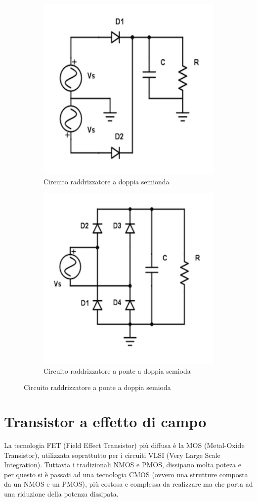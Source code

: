 \documentclass[a4paper,portrait,12pt]{article}
\theoremstyle{definition}
\begin{document}
\begin{figure}[H]
\begin{subfigure}{.5\textwidth}
\centering
\includegraphics[width=.5\linewidth]{img/radd.pdf}
\caption{Circuito raddrizzatore a doppia semionda}
\label{fig:integratore}
\end{subfigure}
\begin{subfigure}{.5\textwidth}
\centering
\includegraphics[width=.5\linewidth]{img/raddponte.pdf}
\caption{Circuito raddrizzatore a ponte a doppia semioda}
\label{fig:derivatore}
\end{subfigure}
\end{figure}


\section{Transistor a effetto di campo}

La tecnologia FET (Field Effect Transistor) più diffusa è la MOS (Metal-Oxide Transistor), utilizzata 
soprattutto per i circuiti VLSI (Very Large Scale Integration). Tuttavia i tradizionali NMOS e PMOS, dissipano
molta poteza e per questo si è passati ad una tecnologia CMOS (ovvero una strutture composta da un NMOS e un
PMOS), più costosa e complessa da realizzare ma che porta ad una riduzione della potenza dissipata.
\bigskip
\end{document}
